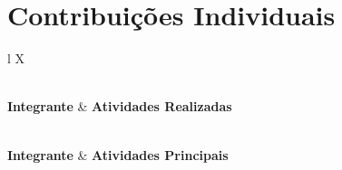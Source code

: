 \small 
\renewcommand{\arraystretch}{1.4} 
\chapter{Contribuições Individuais}

\begin{xltabular}{\textwidth}{l X}
\caption{Contribuições Individuais} \label{tab:contribuicoes_longa} \\
\toprule
\textbf{Integrante} & \textbf{Atividades Realizadas} \\
\midrule
\endfirsthead

 \\
\toprule
\textbf{Integrante} & \textbf{Atividades Principais} \\
\midrule
\endhead

\midrule
{} \\
\endfoot

\bottomrule
\endlastfoot


\end{xltabular}
